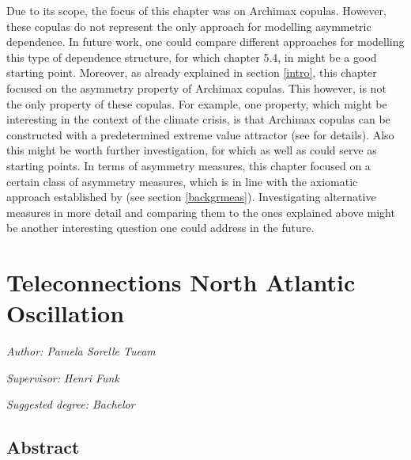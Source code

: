 \documentclass[
]{krantz}
\begin{document}
Due to its scope, the focus of this chapter was on Archimax copulas. However, these copulas do not represent the only approach for modelling asymmetric dependence. In future work, one could compare different approaches for modelling this type of dependence structure, for which chapter 5.4, in \citet{genest2013} might be a good starting point. Moreover, as already explained in section \ref{intro}, this chapter focused on the asymmetry property of Archimax copulas. This however, is not the only property of these copulas. For example, one property, which might be interesting in the context of the climate crisis, is that Archimax copulas can be constructed with a predetermined extreme value attractor (see \citet{caperaa2000} for details). Also this might be worth further investigation, for which \citet{caperaa2000} as well as \citet{chatelain2020} could serve as starting points. In terms of asymmetry measures, this chapter focused on a certain class of asymmetry measures, which is in line with the axiomatic approach established by \citet{durante2010a} (see section \ref{backgrmeas}). Investigating alternative measures in more detail and comparing them to the ones explained above might be another interesting question one could address in the future.

\chapter{Teleconnections North Atlantic Oscillation}\label{nao}

\emph{Author: Pamela Sorelle Tueam}

\emph{Supervisor: Henri Funk}

\emph{Suggested degree: Bachelor}

\section{Abstract}\label{abstract-1}
\end{document}
